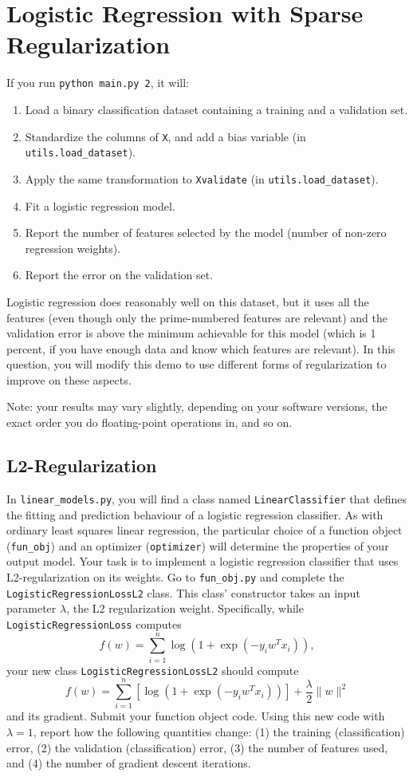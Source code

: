 \documentclass{article}
\def\blu#1{{\color{blu}#1}}
\def\norm#1{\|#1\|}
\let\ask\blu
\begin{document}
\pagebreak

\section{Logistic Regression with Sparse Regularization }

If you run  \verb|python main.py 2|, it will:
\begin{enumerate}
\item Load a binary classification dataset containing a training and a validation set.
\item Standardize the columns of \verb|X|, and add a bias variable (in \verb|utils.load_dataset|).
\item Apply the same transformation to \verb|Xvalidate| (in \verb|utils.load_dataset|).
\item Fit a logistic regression model.
\item Report the number of features selected by the model (number of non-zero regression weights).
\item Report the error on the validation set.
\end{enumerate}
Logistic regression does reasonably well on this dataset,
but it uses all the features (even though only the prime-numbered features are relevant)
and the validation error is above the minimum achievable for this model
(which is 1 percent, if you have enough data and know which features are relevant).
In this question, you will modify this demo to use different forms of regularization
 to improve on these aspects.

Note: your results may vary slightly, depending on your software versions, the exact order you do floating-point operations in, and so on.


\subsection{L2-Regularization }

In \verb|linear_models.py|, you will find a class named \verb|LinearClassifier| that defines the fitting and prediction behaviour of a logistic regression classifier. As with ordinary least squares linear regression, the particular choice of a function object (\verb|fun_obj|) and an optimizer (\verb|optimizer|) will determine the properties of your output model.
Your task is to implement a logistic regression classifier that uses L2-regularization on its weights. Go to \verb|fun_obj.py| and complete the \verb|LogisticRegressionLossL2| class. This class' constructor takes an input parameter $\lambda$, the L2 regularization weight. Specifically, while \verb|LogisticRegressionLoss| computes
\[
f(w) = \sum_{i=1}^n \log(1+\exp(-y_iw^Tx_i)),
\]
your new class \verb|LogisticRegressionLossL2| should compute
\[
f(w) = \sum_{i=1}^n \left[\log(1+\exp(-y_iw^Tx_i))\right] + \frac{\lambda}{2}\norm{w}^2
\]
and its gradient.
\ask{Submit your function object code. Using this new code with $\lambda = 1$, report how the following quantities change: (1) the training (classification) error, (2) the validation (classification) error, (3) the number of features used, and (4) the number of gradient descent iterations.}
\end{document}
